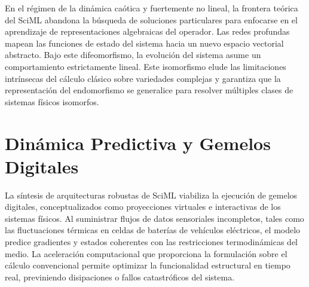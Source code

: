 En el régimen de la dinámica caótica y fuertemente no lineal, la frontera
teórica del SciML abandona la búsqueda de soluciones particulares para
enfocarse en el aprendizaje de representaciones algebraicas del operador. Las
redes profundas mapean las funciones de estado del sistema hacia un nuevo
espacio vectorial abstracto. Bajo este difeomorfismo, la evolución del
sistema asume un comportamiento estrictamente lineal. Este isomorfismo elude
las limitaciones intrínsecas del cálculo clásico sobre variedades complejas
y garantiza que la representación del endomorfismo se generalice para
resolver múltiples clases de sistemas físicos isomorfos.

\section{Dinámica Predictiva y Gemelos Digitales}
\label{sec:gemelos}

La síntesis de arquitecturas robustas de SciML viabiliza la ejecución de
gemelos digitales, conceptualizados como proyecciones virtuales e
interactivas de los sistemas físicos. Al suministrar flujos de datos
sensoriales incompletos, tales como las fluctuaciones térmicas en celdas
de baterías de vehículos eléctricos, el modelo predice gradientes y estados
coherentes con las restricciones termodinámicas del medio. La aceleración
computacional que proporciona la formulación sobre el cálculo convencional
permite optimizar la funcionalidad estructural en tiempo real, previniendo
disipaciones o fallos catastróficos del sistema.
